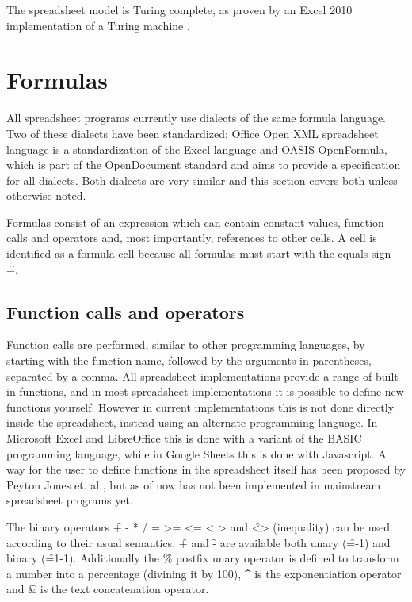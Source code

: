 The spreadsheet model is Turing complete, as proven by an Excel 2010 implementation of a Turing machine \cite{ExcelTuringComplete}.

\section{Formulas}

All spreadsheet programs currently use dialects of the same formula language.
Two of these dialects have been standardized: Office Open XML spreadsheet language is a standardization of the Excel language and OASIS OpenFormula, which is part of the OpenDocument standard and aims to provide a specification for all dialects.
Both dialects are very similar and this section covers both unless otherwise noted.

Formulas consist of an expression which can contain constant values, function calls and operators and, most importantly, references to other cells.
A cell is identified as a formula cell because all formulas must start with the equals sign \f{=}.

\subsection{Function calls and operators}

Function calls are performed, similar to other programming languages, by starting with the function name, followed by the arguments in parentheses, separated by a comma.
All spreadsheet implementations provide a range of built-in functions, and in most spreadsheet implementations it is possible to define new functions yourself.
However in current implementations this is not done directly inside the spreadsheet, instead using an alternate programming language.
In Microsoft Excel and LibreOffice this is done with a variant of the BASIC programming language, while in Google Sheets this is done with Javascript.
A way for the user to define functions in the spreadsheet itself has been proposed by Peyton Jones et. al \cite{jones2003user}, but as of now has not been implemented in mainstream spreadsheet programs yet.

The binary operators \f{+ - * / = >= <= < >} and \f{<>} (inequality) can be used according to their usual semantics.
\f{+} and \f{-} are available both unary (\f{=-1}) and binary (\f{=1-1}).
Additionally the \f{\%} postfix unary operator is defined to transform a number into a percentage (divining it by 100), \f{\textasciicircum} is the exponentiation operator and \f{\&} is the text concatenation operator.


